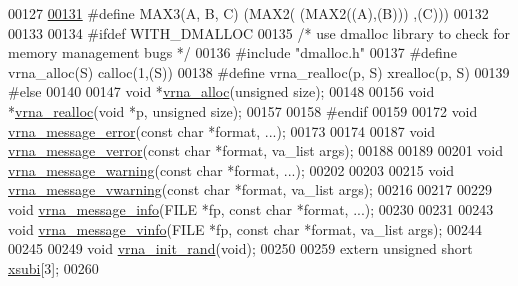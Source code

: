 \begin{DoxyCode}
00127 
\hyperlink{group__utils_ga8d577123d2e66d2b7d0bf9af6e172b93}{00131} \textcolor{preprocessor}{#define MAX3(A, B, C)   (MAX2(  (MAX2((A),(B))) ,(C)))}
00132 
00133 
00134 \textcolor{preprocessor}{#ifdef WITH\_DMALLOC}
00135 \textcolor{comment}{/* use dmalloc library to check for memory management bugs */}
00136 \textcolor{preprocessor}{#include "dmalloc.h"}
00137 \textcolor{preprocessor}{#define vrna\_alloc(S)       calloc(1,(S))}
00138 \textcolor{preprocessor}{#define vrna\_realloc(p, S)  xrealloc(p, S)}
00139 \textcolor{preprocessor}{#else}
00140 
00147 \textcolor{keywordtype}{void}  *\hyperlink{group__utils_gaf37a0979367c977edfb9da6614eebe99}{vrna\_alloc}(\textcolor{keywordtype}{unsigned} size);
00148 
00156 \textcolor{keywordtype}{void}  *\hyperlink{group__utils_ga27f4719a66c6f90d1cca3d1e6e696c6a}{vrna\_realloc}(\textcolor{keywordtype}{void} *p, \textcolor{keywordtype}{unsigned} size);
00157 
00158 \textcolor{preprocessor}{#endif}
00159 
00172 \textcolor{keywordtype}{void} \hyperlink{group__utils_ga36b35be01d7f36cf7f59c245eee628d1}{vrna\_message\_error}(\textcolor{keyword}{const} \textcolor{keywordtype}{char} *format, ...);
00173 
00174 
00187 \textcolor{keywordtype}{void} \hyperlink{group__utils_gabc1a08dea0d84b5c33701732172a8b18}{vrna\_message\_verror}(\textcolor{keyword}{const} \textcolor{keywordtype}{char} *format, va\_list args);
00188 
00189 
00201 \textcolor{keywordtype}{void} \hyperlink{group__utils_ga6e07ed24add60693ba886d54d0a46635}{vrna\_message\_warning}(\textcolor{keyword}{const} \textcolor{keywordtype}{char} *format, ...);
00202 
00203 
00215 \textcolor{keywordtype}{void} \hyperlink{group__utils_ga377aa8ec8a49d343063adb22e6311f26}{vrna\_message\_vwarning}(\textcolor{keyword}{const} \textcolor{keywordtype}{char} *format, va\_list args);
00216 
00217 
00229 \textcolor{keywordtype}{void} \hyperlink{group__utils_ga039bae6153a6415b054dbe6045f83d03}{vrna\_message\_info}(FILE *fp, \textcolor{keyword}{const} \textcolor{keywordtype}{char} *format, ...);
00230 
00231 
00243 \textcolor{keywordtype}{void} \hyperlink{group__utils_gad8b8139bd04fbfb51e398e9fcd6908dc}{vrna\_message\_vinfo}(FILE *fp, \textcolor{keyword}{const} \textcolor{keywordtype}{char} *format, va\_list args);
00244 
00245 
00249 \textcolor{keywordtype}{void} \hyperlink{group__utils_ga0ad1f40ea316e5c5918695c35613027a}{vrna\_init\_rand}(\textcolor{keywordtype}{void});
00250 
00259 \textcolor{keyword}{extern} \textcolor{keywordtype}{unsigned} \textcolor{keywordtype}{short} \hyperlink{group__utils_gaf9a866c8417afda7368bbac939ab3c47}{xsubi}[3];
00260 

\end{DoxyCode}
